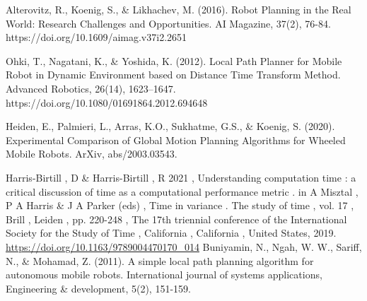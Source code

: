 \begin{thebibliography}{9}
Alterovitz, R., Koenig, S., \& Likhachev, M. (2016). Robot Planning in the Real World: Research Challenges and Opportunities. 
AI Magazine, 37(2), 76-84. https://doi.org/10.1609/aimag.v37i2.2651

Ohki, T., Nagatani, K., \& Yoshida, K. (2012). Local Path Planner for Mobile Robot in Dynamic Environment based on Distance 
Time Transform Method. Advanced Robotics, 26(14), 1623–1647. https://doi.org/10.1080/01691864.2012.694648

Heiden, E., Palmieri, L., Arras, K.O., Sukhatme, G.S., \& Koenig, S. (2020). Experimental Comparison of Global Motion 
Planning Algorithms for Wheeled Mobile Robots. ArXiv, abs/2003.03543.

Harris-Birtill , D \& Harris-Birtill , R 2021 , Understanding computation time : a critical discussion 
of time as a computational performance metric . in A Misztal , P A Harris \& J A Parker (eds) , 
Time in variance . The study of time , vol. 17 , Brill , Leiden , pp. 220-248 , The 17th triennial 
conference of the International Society for the Study of Time , California , California , 
United States, 2019. \url{https://doi.org/10.1163/9789004470170_014}
Buniyamin, N., Ngah, W. W., Sariff, N., \& Mohamad, Z. (2011). A simple local path planning algorithm 
for autonomous mobile robots. International journal of systems applications, Engineering \& development, 
5(2), 151-159.

\end{thebibliography}


